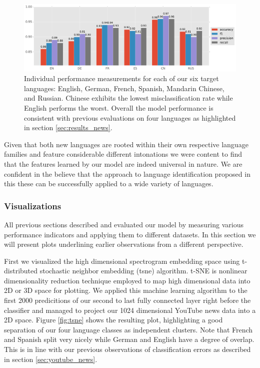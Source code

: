 	\begin{figure}[]
  		\centering
    	\includegraphics[width=\textwidth, keepaspectratio]{plots/results_6lang_plot.pdf}
    	\caption{Individual performance measurements for each of our six target languages: English, German, French, Spanish, Mandarin Chinese, and Russian. Chinese exhibits the lowest misclassification rate while English performs the worst. Overall the model performance is consistent with previous evaluations on four languages as highlighted in section \ref{sec:results_news}.}
    	\label{fig:6lang}
	\end{figure}

Given that both new languages are rooted within their own respective language families and feature considerable different intonations we were content to find that the features learned by our model are indeed universal in nature. We are confident in the believe that the approach to language identification proposed in this these can be successfully applied to a wide variety of languages.

\subsubsection{Visualizations} 
\label{sec:visualization}
All previous sections described and evaluated our model by measuring various performance indicators and applying them to different datasets. In this section we will present plots underlining earlier observations from a different perspective.

First we visualized the high dimensional spectrogram embedding space using t-distributed stochastic neighbor embedding (\ac{tsne}) algorithm\cite{maaten2008visualizing}. t-SNE is nonlinear dimensionality reduction technique employed to map high dimensional data into 2D or 3D space for plotting. We applied this machine learning algorithm to the first 2000 predicitions of our second to last fully connected layer right before the classifier and managed to project our 1024 dimensional YouTube news data into a 2D space. Figure \ref{fig:tsne} shows the resulting plot, highlighting a good separation of our four language classes as independent clusters. Note that French and Spanish split very nicely while German and English have a degree of overlap. This is in line with our previous observations of classification errors as described in section \ref{sec:youtube_news}.

